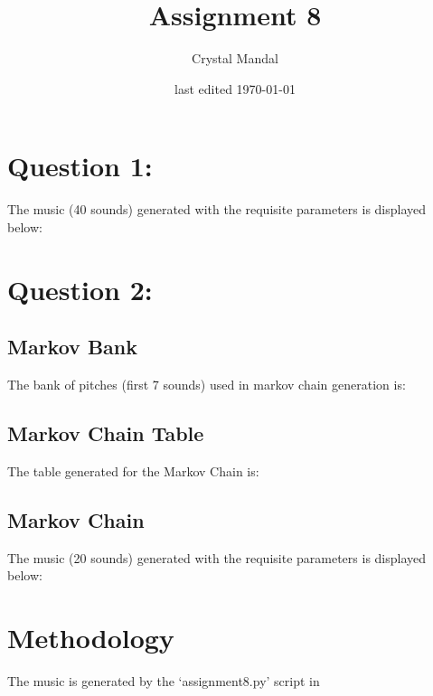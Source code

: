 \documentclass[12pt,letterpaper]{article}
\title{Assignment 8}
\author{Crystal Mandal}
\date{last edited \today}
\begin{document}
\maketitle

\section{Question 1:}
The music (40 sounds) generated with the requisite parameters is displayed below:


\section{Question 2:}
\subsection{Markov Bank}
The bank of pitches (first 7 sounds) used in markov chain generation is:


\subsection{Markov Chain Table}
The table generated for the Markov Chain is:


\subsection{Markov Chain}
The music (20 sounds) generated with the requisite parameters is displayed below:


\section{Methodology}
The music is generated by the `assignment8.py' script in
\end{document}

